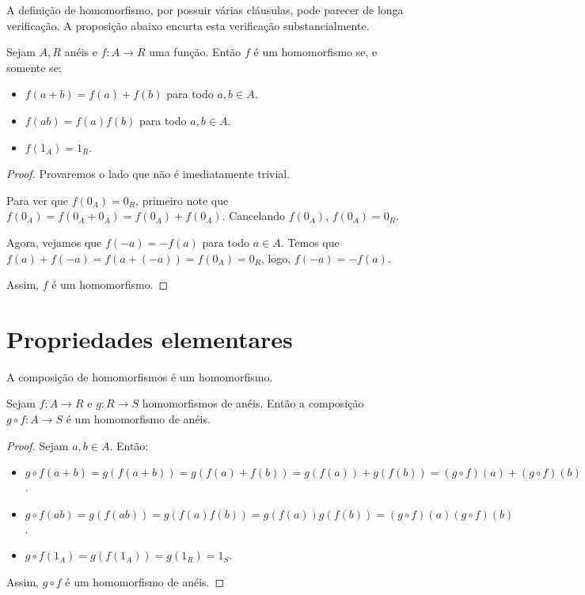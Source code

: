A definição de homomorfismo, por possuir várias cláusulas, pode parecer de longa verificação.
A proposição abaixo encurta esta verificação substancialmente.

\begin{prop}
    Sejam $A, R$ anéis e $f:A\rightarrow R$ uma função.
    Então $f$ é um homomorfismo se, e somente se:
    \begin{itemize}
        \item $f(a+b)=f(a)+f(b)$ para todo $a, b \in A$.
        \item $f(ab)=f(a)f(b)$ para todo $a, b \in A$.
        \item $f(1_A)=1_R$.
    \end{itemize}
\end{prop}
\begin{proof}
    Provaremos o lado que não é imediatamente trivial.

    Para ver que $f(0_A)=0_R$, primeiro note que $f(0_A)=f(0_A+0_A)=f(0_A)+f(0_A)$. Cancelando $f(0_A)$, $f(0_A)=0_R$.

    Agora, vejamos que $f(-a)=-f(a)$ para todo $a \in A$.
    Temos que $f(a)+f(-a)=f(a+(-a))=f(0_A)=0_R$, logo, $f(-a)=-f(a)$.

    Assim, $f$ é um homomorfismo.
\end{proof}

\section{Propriedades elementares}
A composição de homomorfismos é um homomorfismo.
\begin{lemma}\label{prop:homoIdeal_composicao}
    Sejam $f:A\rightarrow R$ e $g:R\rightarrow S$ homomorfismos de anéis.
    Então a composição $g\circ f:A\rightarrow S$ é um homomorfismo de anéis.
\end{lemma}

\begin{proof}
    Sejam $a, b \in A$. Então:
    \begin{itemize}
        \item $g\circ f(a+b)=g(f(a+b))=g(f(a)+f(b))=g(f(a))+g(f(b))=(g\circ f)(a)+(g\circ f)(b)$.
        \item $g\circ f(ab)=g(f(ab))=g(f(a)f(b))=g(f(a))g(f(b))=(g\circ f)(a)(g\circ f)(b)$.
        \item $g\circ f(1_A)=g(f(1_A))=g(1_R)=1_S$.
    \end{itemize}
    Assim, $g\circ f$ é um homomorfismo de anéis.
\end{proof}

